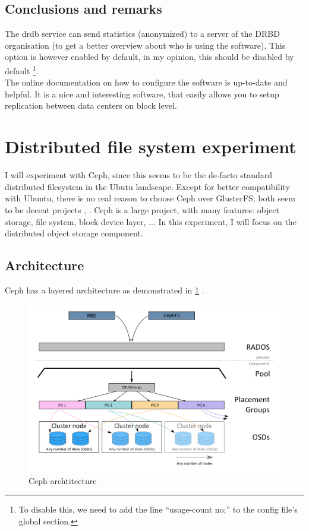 \documentclass[12pt]{report}
\begin{document}
\subsection{Conclusions and remarks}
The drdb service can send statistics (anonymized) to a
server of the DRBD organisation (to get a better overview about who is
using the software). This option is however enabled by
default, in my opinion, this should be disabled by default
\footnote{To disable this, we need to add the line ``usage-count no;''
  to the config file's global section.}.\\
The online documentation on how to configure the software is
up-to-date and helpful. It is a nice and interesting software, that easily allows you
to setup replication between data centers on block level.

\section{Distributed file system experiment}
I will experiment with Ceph, since this seems to be the de-facto
standard distributed filesystem in the Ubutu landscape.
Except for better compatibility with Ubuntu, there is no real reason
to choose Ceph over GlusterFS; both seem to be decent projects
\cite{ceph_vs_gluster_1}, \cite{ceph_vs_gluster_debate}.
Ceph is a large project, with many features: object storage, file
system, block device layer, ... In this experiment, I will focus on
the distributed object storage component.

\subsection{Architecture}
\label{subsec:ceph_architecture}
Ceph has a layered architecture as demonstrated in
\cref{fig:ceph_architecture} \cite{ceph_architecture}.

\begin{figure}[h!]
  \caption{Ceph archtitecture}
  \label{fig:ceph_architecture}
  \centering
    \includegraphics[scale=0.3]{pics/ceph_architecture.png}
\end{figure}
\end{document}
